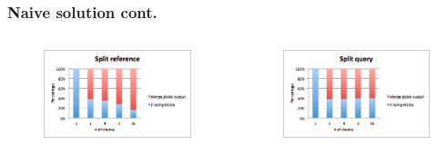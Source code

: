 \documentclass{beamer}
\begin{document}
\begin{frame}
\frametitle{Naive solution cont.}
  \begin{columns}
    \begin{column}{0.5\textwidth}
    \begin{figure}
      \includegraphics[scale=0.5]{ref_naive.png}
    \end{figure}
  \end{column}
  \begin{column}{0.5\textwidth}
  \begin{figure}
    \includegraphics[scale=0.5]{qry_naive.png}
  \end{figure}
\end{column}
\end{columns}
\end{frame}
\end{document}
